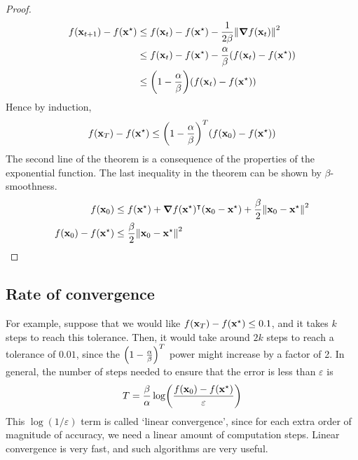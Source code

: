 \begin{proof}
	\begin{align*}
		f(\vb x_{t+1}) - f(\vb x^\star) & \leq f(\vb x_t) - f(\vb x^\star) - \frac{1}{2\beta} \norm{\grad{f(\vb x_t)}}^2            \\
		                                & \leq f(\vb x_t) - f(\vb x^\star) - \frac{\alpha}{\beta} \qty(f(\vb x_t) - f(\vb x^\star)) \\
		                                & \leq \qty(1 - \frac{\alpha}{\beta}) \qty(f(\vb x_t) - f(\vb x^\star))
	\end{align*}
	Hence by induction,
	\[
		f(\vb x_T) - f(\vb x^\star) \leq \qty(1 - \frac{\alpha}{\beta})^T \qty(f(\vb x_0) - f(\vb x^\star))
	\]
	The second line of the theorem is a consequence of the properties of the exponential function.
	The last inequality in the theorem can be shown by \(\beta\)-smoothness.
	\begin{align*}
		f(\vb x_0)                  & \leq f(\vb x^\star) + \grad{f(\vb x^\star)}^\intercal (\vb x_0 - \vb x^\star) + \frac{\beta}{2}\norm{\vb x_0 - \vb x^\star}^2 \\
		f(\vb x_0) - f(\vb x^\star) & \leq \frac{\beta}{2}\norm{\vb x_0 - \vb x^\star}^2                                                                             \\
	\end{align*}
\end{proof}

\subsection{Rate of convergence}
For example, suppose that we would like \(f(\vb x_T)  - f(\vb x^\star) \leq 0.1\), and it takes \(k\) steps to reach this tolerance.
Then, it would take around \(2k\) steps to reach a tolerance of \(0.01\), since the \(\qty(1 - \frac{\alpha}{\beta})^T\) power might increase by a factor of 2.
In general, the number of steps needed to ensure that the error is less than \(\varepsilon\) is
\[
	T = \frac{\beta}{\alpha} \log(\frac{f(\vb x_0) - f(\vb x^\star)}{\varepsilon})
\]
This \(\log(1/\varepsilon)\) term is called `linear convergence', since for each extra order of magnitude of accuracy, we need a linear amount of computation steps.
Linear convergence is very fast, and such algorithms are very useful.

